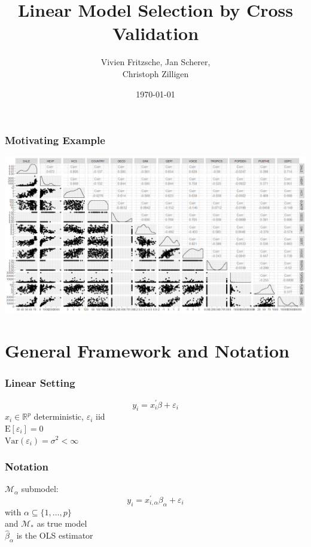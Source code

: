 \documentclass[20pt,mathserif,xcolor=dvipsnames]{beamer}
\title[Cross Validation]{ Linear Model Selection by Cross Validation}
\author{ Vivien Fritzsche, Jan Scherer, \\ Christoph Zilligen}
\date{\today}
\newcommand{\E}{\mathrm{E}}
\newcommand{\Var}{\mathrm{Var}}
\begin{document}
\beamertemplatenavigationsymbolsempty
\begin{frame}
\titlepage
\thispagestyle{empty}
\end{frame}

\begin{frame}
\frametitle{Motivating Example}
\centering
\includegraphics[width=1.25\textheight]{scatterplot.png}
\end{frame}

\thispagestyle{empty}
\section{General Framework and Notation}

\begin{frame}
\frametitle{Linear Setting}
\[
	y_i=x_i^\prime\beta+\varepsilon_i
\]
$x_i\in \mathbb{R}^p$ deterministic, $\varepsilon_i$ iid \\\vspace*{5pt}
$\E[\varepsilon_i]=0$\\\vspace*{5pt}
$\Var(\varepsilon_i)=\sigma^2<\infty$
\end{frame}

\begin{frame}
\frametitle{Notation}
$\mathcal{M}_\alpha$ submodel:
\[
	y_i=x_{i,\alpha}^\prime\beta_\alpha+\varepsilon_i
\]
with $\alpha\subseteq\{1,\ldots,p\}$\\\vspace*{5pt}
and $\mathcal{M}_\ast$ as true model\\\vspace*{5pt}
$\hat{\beta}_\alpha$ is the OLS estimator
\end{frame}
\end{document}
